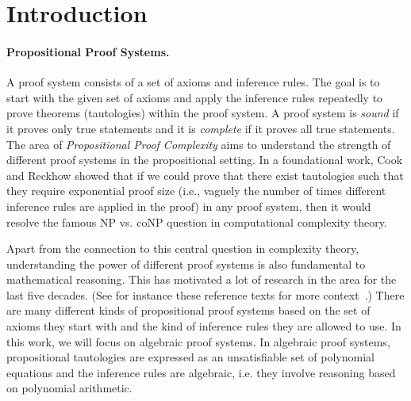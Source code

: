 \documentclass[11pt]{article}
\begin{document}
        \newpage 
        
\tableofcontents

        \newpage


\section{Introduction}
\label{sec:intro}
\paragraph{Propositional Proof Systems.} A proof system consists of a set of axioms and inference rules. The goal is to start with the given set of axioms and apply the inference rules repeatedly to prove theorems (tautologies) within the proof system.  A proof system is \emph{sound} if it proves only true statements and it is \emph{complete} if it proves all true statements. The area of \emph{Propositional Proof Complexity} aims to understand the strength of different proof systems in the propositional setting. In a foundational work, Cook and Reckhow \cite{CR79} showed that if we could prove that there exist tautologies such that they require exponential proof size (i.e., vaguely the number of times different inference rules are applied in the proof) in any proof system, then it would resolve the famous NP vs. coNP question in computational complexity theory. 


Apart from the connection to this central question in complexity theory, understanding the power of different proof systems is also fundamental to mathematical reasoning. This has motivated a lot of research in the area for the last five decades. (See for instance these reference texts for more context~\cite{krabook95,CloteKSurvey02,krabook2019}.) There are many different kinds of propositional proof systems based on the set of axioms they start with and the kind of inference rules they are allowed to use. In this work, we will focus on algebraic proof systems. In algebraic proof systems, propositional tautologies are expressed as an unsatisfiable set of polynomial equations and the inference rules are algebraic, i.e. they involve reasoning based on polynomial arithmetic.
\end{document}
